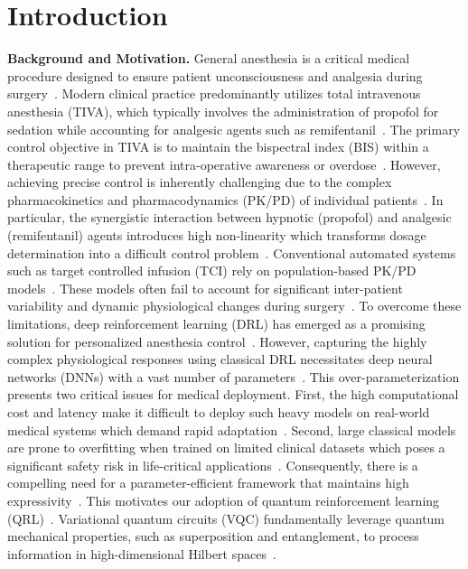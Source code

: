 \documentclass[pdflatex,sn-mathphys-num]{sn-jnl}%
\newcommand{\BfPara}[1]{{\noindent\bf#1.}\xspace}
\theoremstyle{thmstyleone}%
\theoremstyle{thmstyletwo}%
\theoremstyle{thmstylethree}%
\begin{document}
\section{Introduction}\label{sec1}
\BfPara{Background and Motivation}
General anesthesia is a critical medical procedure designed to ensure patient unconsciousness and analgesia during surgery~\citep{eme_10_geb}. 
%
Modern clinical practice predominantly utilizes total intravenous anesthesia (TIVA), which typically involves the administration of propofol for sedation while accounting for analgesic agents such as remifentanil~\citep{al_16_pri}. 
%
The primary control objective in TIVA is to maintain the bispectral index (BIS) within a therapeutic range to prevent intra-operative awareness or overdose~\citep{my_04_bis}.
%
However, achieving precise control is inherently challenging due to the complex pharmacokinetics and pharmacodynamics (PK/PD) of individual patients~\citep{dum_13_clo}. 
%
In particular, the synergistic interaction between hypnotic (propofol) and analgesic (remifentanil) agents introduces high non-linearity which transforms dosage determination into a difficult control problem~\citep{bou_04_pha}.
%
Conventional automated systems such as target controlled infusion (TCI) rely on population-based PK/PD models~\citep{vuy_95_per}. 
%
These models often fail to account for significant inter-patient variability and dynamic physiological changes during surgery~\citep{ken_99_clo}. 
%
To overcome these limitations, deep reinforcement learning (DRL) has emerged as a promising solution for personalized anesthesia control~\citep{egh_21_pat}. 
%
However, capturing the highly complex physiological responses using classical DRL necessitates deep neural networks (DNNs) with a vast number of parameters~\citep{est_19_agu}. 
%
This over-parameterization presents two critical issues for medical deployment. 
%
First, the high computational cost and latency make it difficult to deploy such heavy models on real-world medical systems which demand rapid adaptation~\citep{che_19_dee, dul_21_cha}.
%
Second, large classical models are prone to overfitting when trained on limited clinical datasets which poses a significant safety risk in life-critical applications~\citep{got_19_gui, wie_19_don}. Consequently, there is a compelling need for a parameter-efficient framework that maintains high expressivity~\citep{sch_21_eff}. 
%
This motivates our adoption of quantum reinforcement learning (QRL)~\citep{lock_20_rei}. 
%
Variational quantum circuits (VQC) fundamentally leverage quantum mechanical properties, such as superposition and entanglement, to process information in high-dimensional Hilbert spaces~\citep{cer_21_var}. 
\end{document}
